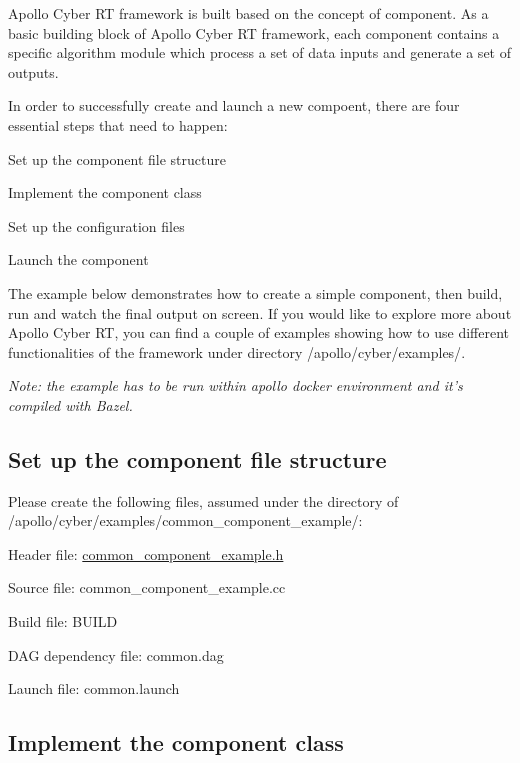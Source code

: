 Apollo Cyber R\-T framework is built based on the concept of component. As a basic building block of Apollo Cyber R\-T framework, each component contains a specific algorithm module which process a set of data inputs and generate a set of outputs.

In order to successfully create and launch a new compoent, there are four essential steps that need to happen\-:


\begin{DoxyItemize}
\item Set up the component file structure
\item Implement the component class
\item Set up the configuration files
\item Launch the component
\end{DoxyItemize}

The example below demonstrates how to create a simple component, then build, run and watch the final output on screen. If you would like to explore more about Apollo Cyber R\-T, you can find a couple of examples showing how to use different functionalities of the framework under directory {\ttfamily /apollo/cyber/examples/}.

{\itshape Note\-: the example has to be run within apollo docker environment and it's compiled with Bazel.}

\subsection*{Set up the component file structure}

Please create the following files, assumed under the directory of {\ttfamily /apollo/cyber/examples/common\-\_\-component\-\_\-example/}\-:


\begin{DoxyItemize}
\item Header file\-: \hyperlink{common__component__example_8h}{common\-\_\-component\-\_\-example.\-h}
\item Source file\-: common\-\_\-component\-\_\-example.\-cc
\item Build file\-: B\-U\-I\-L\-D
\item D\-A\-G dependency file\-: common.\-dag
\item Launch file\-: common.\-launch
\end{DoxyItemize}

\subsection*{Implement the component class}

